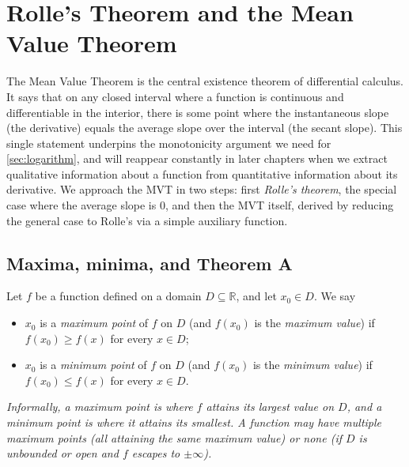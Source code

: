 \section{Rolle's Theorem and the Mean Value Theorem}\label{sec:rolle-and-mvt}

The Mean Value Theorem is the central existence theorem of differential calculus. It says that on any closed interval where a function is continuous and differentiable in the interior, there is some point where the instantaneous slope (the derivative) equals the average slope over the interval (the secant slope). This single statement underpins the monotonicity argument we need for \cref{sec:logarithm}, and will reappear constantly in later chapters when we extract qualitative information about a function from quantitative information about its derivative. We approach the MVT in two steps: first \emph{Rolle's theorem}, the special case where the average slope is \(0\), and then the MVT itself, derived by reducing the general case to Rolle's via a simple auxiliary function.

\subsection{Maxima, minima, and Theorem A}

\begin{definition}\label{def:max-min}
Let \(f\) be a function defined on a domain \(D \subseteq \mathbb{R}\), and let \(x_{0} \in D\). We say
\begin{itemize}
    \item \(x_{0}\) is a \emph{maximum point} of \(f\) on \(D\) (and \(f(x_{0})\) is the \emph{maximum value}) if \(f(x_{0}) \geq f(x)\) for every \(x \in D\);
    \item \(x_{0}\) is a \emph{minimum point} of \(f\) on \(D\) (and \(f(x_{0})\) is the \emph{minimum value}) if \(f(x_{0}) \leq f(x)\) for every \(x \in D\).
\end{itemize}

\emph{Informally, a maximum point is where \(f\) attains its largest value on \(D\), and a minimum point is where it attains its smallest. A function may have multiple maximum points (all attaining the same maximum value) or none (if \(D\) is unbounded or open and \(f\) escapes to \(\pm\infty\)).}
\end{definition}

